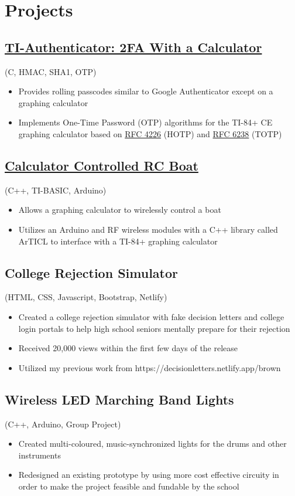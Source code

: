 \documentclass{article}
\begin{document}
\section{Projects}
\subsection{\href{}{TI-Authenticator: 2FA With a Calculator}} (C, HMAC, SHA1, OTP)
\begin{itemize}
    \item Provides rolling passcodes similar to Google Authenticator except on a graphing calculator
    \item Implements One-Time Password (OTP) algorithms for the TI-84+ CE graphing calculator based on \href{https://tools.ietf.org/html/rfc4226}{RFC 4226} (HOTP) and \href{https://tools.ietf.org/html/rfc6238}{RFC 6238} (TOTP)
\end{itemize}

\subsection{\href{}{Calculator Controlled RC Boat}} (C++, TI-BASIC, Arduino)
\begin{itemize}
    \item Allows a graphing calculator to wirelessly control a boat
    \item Utilizes an Arduino and RF wireless modules with a C++ library called ArTICL to interface with a TI-84+ graphing calculator
\end{itemize}

\subsection{College Rejection Simulator} (HTML, CSS, Javascript, Bootstrap, Netlify)
\begin{itemize}
    \item Created a college rejection simulator with fake decision letters and college login portals to help high school seniors mentally prepare for their rejection
    \item Received 20,000 views within the first few days of the release
    \item Utilized my previous work from https://decisionletters.netlify.app/brown
\end{itemize}

\subsection{Wireless LED Marching Band Lights} (C++, Arduino, Group Project)
\begin{itemize}
    \item Created multi-coloured, music-synchronized lights for the drums and other instruments
    \item Redesigned an existing prototype by using more cost effective circuity in order to make the project feasible and fundable by the school
\end{itemize}
\end{document}

